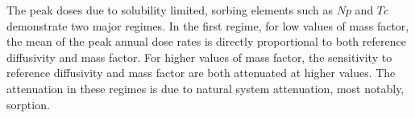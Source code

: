 The peak doses due to solubility limited, sorbing elements such as $Np$ and 
$Tc$ demonstrate two major regimes. In the first regime, for 
low values of mass factor, the mean of the peak annual dose rates is directly 
proportional to both reference diffusivity and mass factor.  For higher values 
of mass factor, the sensitivity to reference diffusivity and mass factor are 
both attenuated at higher values.  The attenuation in these regimes 
is due to natural system attenuation, most notably, sorption.

%
%
